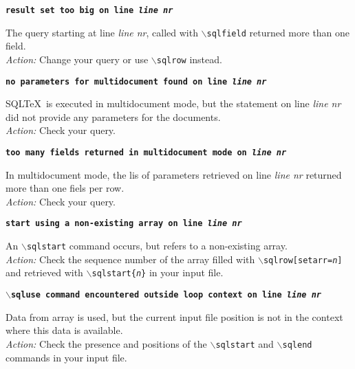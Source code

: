 \documentclass{article}
\newcommand{\bs}{\ensuremath{\backslash}}
\newcommand{\vs}{\vspace{3mm}}
\begin{document}
\vs

\noindent\textbf{\texttt{result set too big on line \textit{line nr}}}

\vspace{1mm}

\noindent The query starting at line \textit{line nr}, called with \texttt{\bs sqlfield} returned more than one field. \\
\textit{Action:} Change your query or use \texttt{\bs sqlrow} instead.

\vs

\noindent\textbf{\texttt{no parameters for multidocument found on line \textit{line nr}}}

\vspace{1mm}

\noindent SQL\TeX\ is executed in multidocument mode, but the statement on line
\textit{line nr} did not provide any parameters for the documents. \\
\textit{Action:} Check your query.

\vs

\noindent\textbf{\texttt{too many fields returned in multidocument mode on \textit{line nr}}}

\vspace{1mm}

\noindent In multidocument mode, the lis of parameters retrieved on line
\textit{line nr} returned more than one fiels per row. \\
\textit{Action:} Check your query.

\vs

\noindent\textbf{\texttt{start using a non-existing array on line \textit{line nr}}}

\vspace{1mm}

\noindent An \texttt{\bs sqlstart} command occurs, but refers to a non-existing array. \\
\textit{Action:} Check the sequence number of the array filled with \texttt{\bs sqlrow[setarr=\textit{n}]} and retrieved with \texttt{\bs sqlstart\{\textit{n}\}} in your input file.

\vs

\noindent\textbf{\texttt{\bs sqluse command encountered outside loop context on line \textit{line nr}}}

\vspace{1mm}

\noindent Data from array is used, but the current input file position is not in the context where this data is available.\\
\textit{Action:} Check the presence and positions of the \texttt{\bs sqlstart} and \texttt{\bs sqlend} commands in your input file.
\end{document}
